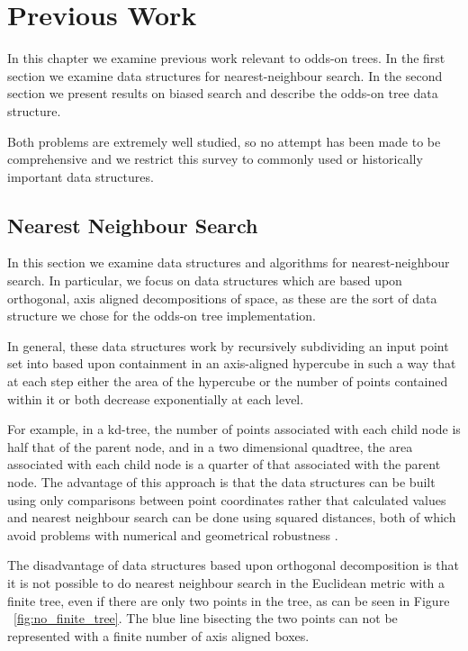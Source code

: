 \documentclass[mcs]{scsthesis}
\begin{document}
\chapter{Previous Work}

In this chapter we examine previous work relevant to odds-on trees. In the first
section we examine data structures for nearest-neighbour search. In the second
section we present results on biased search and describe the odds-on tree data
structure.

Both problems are extremely well studied, so no attempt has been made to be
comprehensive and we restrict this survey to commonly used or historically
important data structures.

\section{Nearest Neighbour Search}

In this section we examine data structures and algorithms for nearest-neighbour
search. In particular, we focus on data structures which are based upon
orthogonal, axis aligned decompositions of space, as these are the sort of data
structure we chose for the odds-on tree implementation.

In general, these data structures work by recursively subdividing an input point
set into based upon containment in an axis-aligned hypercube in such a way that
at each step either the area of the hypercube or the number of points contained
within it or both decrease exponentially at each level.

For example, in a kd-tree, the number of points associated with each child node
is half that of the parent node, and in a two dimensional quadtree, the area
associated with each child node is a quarter of that associated with the parent
node. The advantage of this approach is that the data structures can be built
using only comparisons between point coordinates rather that calculated values
and nearest neighbour search can be done using squared distances, both of which
avoid problems with numerical and geometrical robustness \cite{shewchuk}.

The disadvantage of data structures based upon orthogonal decomposition is that
it is not possible to do nearest neighbour search in the Euclidean metric with
a finite tree, even if there are only two points in the tree, as can be seen
in Figure ~\ref{fig:no_finite_tree}. The blue line bisecting the two
points can not be represented with a finite number of axis aligned boxes.
\end{document}

